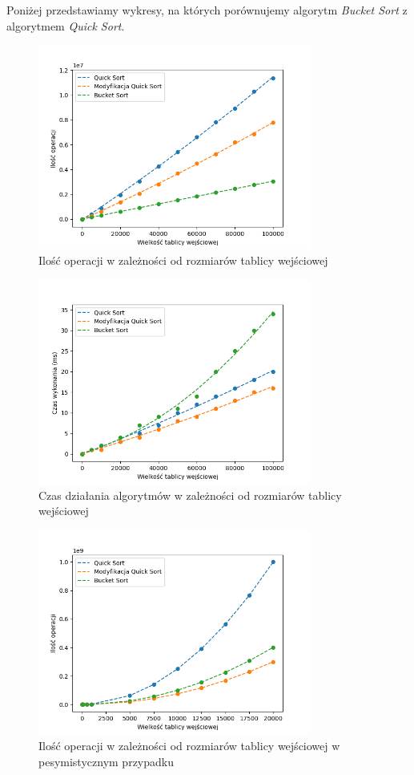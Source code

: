\documentclass{article}
\begin{document}
Poniżej przedstawiamy wykresy, na których porównujemy algorytm \textit{Bucket Sort} z algorytmem \textit{Quick Sort}.

\begin{figure}[H]
    \centering
    \includegraphics[width=0.8\textwidth]{Figure_5.png}
    \caption{Ilość operacji w zależności od rozmiarów tablicy wejściowej}
    \label{fig:bucket}
\end{figure}
\begin{figure}[H]
    \centering
    \includegraphics[width=0.8\textwidth]{Figure_6.png}
    \caption{Czas działania algorytmów w zależności od rozmiarów tablicy wejściowej}
    \label{fig:buckett}
\end{figure}
\begin{figure}[H]
    \centering
    \includegraphics[width=0.8\textwidth]{Figure_9.png}
    \caption{Ilość operacji w zależności od rozmiarów tablicy wejściowej w pesymistycznym przypadku}
    \label{fig:bucket}
\end{figure}
\end{document}
